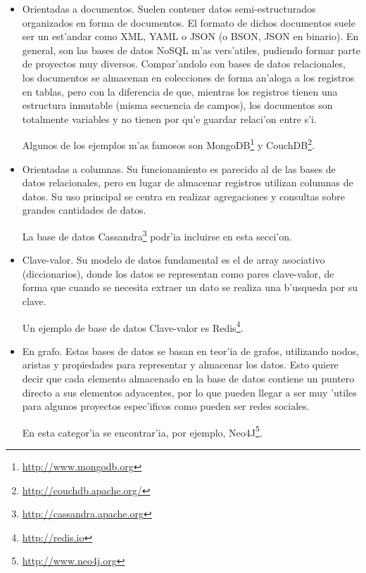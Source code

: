 \begin{itemize}
 \item Orientadas a documentos.
 Suelen contener datos semi-estructurados organizados en forma de documentos. El formato de dichos
 documentos suele ser un est'andar como XML, YAML o JSON (o BSON, JSON en binario). En general, son las bases
 de datos NoSQL m'as vers'atiles, pudiendo formar parte de proyectos muy diversos. Compar'andolo
 con bases de datos relacionales, los documentos se almacenan en colecciones de forma an'aloga
 a los registros en tablas, pero con la diferencia de que, mientras los registros tienen una
 estructura inmutable (misma secuencia de campos), los documentos son totalmente variables y
 no tienen por qu'e guardar relaci'on entre s'i.
 
 Algunos de los ejemplos m'as famosos son MongoDB\footnote{\url{http://www.mongodb.org}} y CouchDB\footnote{\url{http://couchdb.apache.org/}}.
 
 \item Orientadas a columnas.
 Su funcionamiento es parecido al de las bases de datos relacionales, pero en lugar de almacenar registros
 utilizan columnas de datos. Su uso principal se centra en realizar agregaciones y consultas sobre
 grandes cantidades de datos.
 
 La base de datos Cassandra\footnote{\url{http://cassandra.apache.org}} podr'ia incluirse en esta secci'on.
 
 \item Clave-valor.
 Su modelo de datos fundamental es el de array asociativo (diccionarios), donde los datos se representan
 como pares clave-valor, de forma que cuando se necesita extraer un dato se realiza una
 b'usqueda por su clave.
 
 Un ejemplo de base de datos Clave-valor es Redis\footnote{\url{http://redis.io}}.
 
 \item En grafo.
 Estas bases de datos se basan en teor'ia de grafos, utilizando nodos, aristas y propiedades para
 representar y almacenar los datos. Esto quiere decir que cada elemento almacenado en la base
 de datos contiene un puntero directo a sus elementos adyacentes, por lo que pueden llegar a
 ser muy 'utiles para algunos proyectos espec'ificos como pueden ser redes sociales.
 
 En esta categor'ia se encontrar'ia, por ejemplo, Neo4J\footnote{\url{http://www.neo4j.org}}.
 
\end{itemize}

